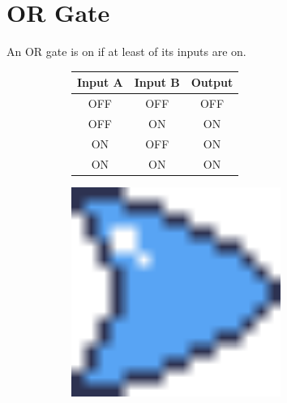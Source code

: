 \documentclass[12pt]{book}
\newcommand{\ON}{\textcolor{on}{ON}}
\newcommand{\OFF}{\textcolor{off}{OFF}}
\begin{document}
		\section{OR Gate}
			An OR gate is on if at least of its inputs are on.
			\begin{figure}[h]
				\centering
				\begin{subfigure}{0.75\textwidth}
					\begin{tabular}{|c|c|c|}
						\hline
						\textbf{Input A} & \textbf{Input B} & \textbf{Output}\\\hline
						\OFF & \OFF & \OFF\\\hline
						\OFF & \ON & \ON\\\hline
						\ON & \OFF & \ON\\\hline
						\ON & \ON & \ON\\\hline
					\end{tabular}
				\end{subfigure}
				\begin{subfigure}{0.2\textwidth}
					\centering
					\includegraphics[width=0.75\textwidth]{OR}
				\end{subfigure}
			\end{figure}
		\vspace{-20pt}
\end{document}
